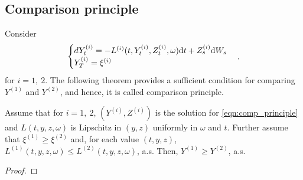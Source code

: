 \documentclass[11pt]{book}
\newcommand{\dt}{\text{\normalfont d}t}
\newcommand{\dW}{\text{\normalfont d}W}
\begin{document}
\subsection{Comparison principle}\label{sec:comp_principle}
Consider 
\begin{equation}\label{eqn:comp_principle}
	\begin{cases}
		dY^{(i)}_t=-L^{(i)}(t,Y^{(i)}_t,Z^{(i)}_t,\omega){{\dt}}+Z^{(i)}_s\dW_s\\
		Y^{(i)}_T=\xi^{(i)}
	\end{cases},
\end{equation}
for $i=1,~2$. The following theorem provides a sufficient condition for comparing $Y^{(1)}$ and $Y^{(2)}$, and hence, it is called comparison principle.
\begin{thm}\label{thm:comp_principle}
Assume that for $i=1,~2$, $(Y^{(i)},Z^{(i)})$ is the solution for \eqref{eqn:comp_principle} and $L(t,y,z,\omega)$ is Lipschitz in $(y,z)$ uniformly in $\omega$ and $t$.
	Further assume that $\xi^{(1)}\ge\xi^{(2)}$ and, for each value $(t,y,z)$, $L^{(1)}(t,y,z,\omega)\le L^{(2)}(t,y,z,\omega)$, a.s.
	Then, $Y^{(1)}\ge Y^{(2)}$, a.s.
\end{thm}
\begin{proof}
	
\end{proof}

\end{document}
